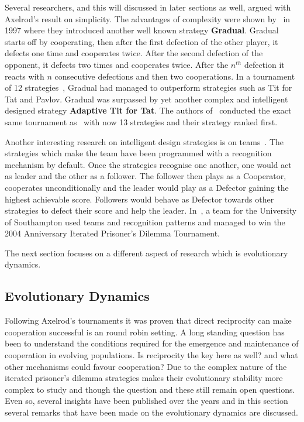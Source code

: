 \documentclass{article}
\theoremstyle{definition}
\begin{document}
Several researchers, and this will discussed in later sections as well, argued
with Axelrod's result on simplicity. The advantages of complexity were shown
by~\cite{Beaufils1997} in 1997 where they introduced another well known strategy
\textbf{Gradual}. Gradual starts off by cooperating,
then after the first defection of the other player, it defects one time and cooperates
twice. After the second defection of the opponent, it defects two times and cooperates
twice. After the \(n^{th}\) defection it reacts with \(n\) consecutive defections 
and then two cooperations. In a tournament of 12 strategies~\cite{Beaufils1997},
Gradual had managed to outperform strategies such as Tit for Tat and Pavlov.
Gradual was surpassed by yet another complex and intelligent designed strategy
\textbf{Adaptive Tit for Tat}. The authors of~\cite{tzafestas-2000a} conducted
the exact same tournament as~\cite{Beaufils1997} with now 13 strategies and their
strategy ranked first.

Another interesting research on intelligent design strategies is on teams~\cite{J.P.Delahaye1993Lp,
J.P.Delahaye1995LIeP, A.Rogers2007Ctpw}. The strategies which make the team 
have been programmed with a recognition mechanism
by default. Once the strategies recognise one another, one would act as leader
and the other as a follower. The follower then plays as a Cooperator, cooperates
unconditionally and the leader would play as a Defector gaining the highest achievable
score. Followers would behave as Defector towards other strategies to defect
their score and help the leader. In~\cite{A.Rogers2007Ctpw}, a team for the University
of Southampton used teams and recognition patterns and managed to win the 2004
Anniversary Iterated Prisoner's Dilemma Tournament.

The next section focuses on a different aspect of research which is evolutionary
dynamics.

\subsection{Evolutionary Dynamics}\label{subsection:evolutionary_dynamics}

Following Axelrod's tournaments it was proven that direct reciprocity can
make cooperation successful is an round robin setting. A long standing question
has been to understand the conditions required for the emergence and maintenance
of cooperation in evolving populations. Is reciprocity the key here as well?
and what other mechanisms could favour cooperation? Due to the complex nature of
the iterated prisoner's dilemma strategies makes their evolutionary stability
more complex to study and though the question and these still remain open questions.
Even so, several insights have been published over the years and in this section
several remarks that have been made on the evolutionary dynamics are discussed.
\end{document}
